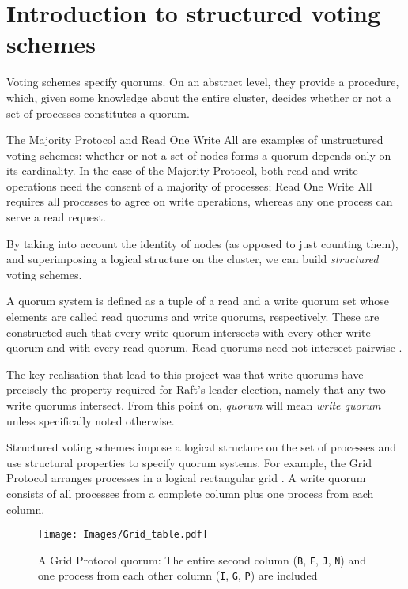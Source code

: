 \documentclass[12pt,chapterprefix=true,toc=bibliography,numbers=noendperiod,
               footnotes=multiple,twoside]{scrreprt}
\begin{document}
\section{Introduction to structured voting schemes}
\label{ssc:structured-voting-schemes}

Voting schemes specify quorums. On an abstract level, they provide a procedure, which, given some knowledge about the entire cluster, decides whether or not a set of processes constitutes a quorum.

The Majority Protocol and Read One Write All are examples of unstructured voting schemes: whether or not a set of nodes forms a quorum depends only on its cardinality. In the case of the Majority Protocol, both read and write operations need the consent of a majority of processes; Read One Write All requires all processes to agree on write operations, whereas any one process can serve a read request.

By taking into account the identity of nodes (as opposed to just counting them), and superimposing a logical structure on the cluster, we can build \emph{structured} voting schemes.


A quorum system is defined as a tuple of a read and a write quorum set whose elements are called read quorums and write quorums, respectively. These are constructed such that every write quorum intersects with every other write quorum and with every read quorum. Read quorums need not intersect pairwise \autocite[For a formal definition of \emph{quorum}, \emph{quorum set} and \emph{quorum system}, see][section 2.3]{voting}.

The key realisation that lead to this project was that write quorums have precisely the property required for Raft's leader election, namely that any two write quorums intersect. From this point on, \emph{quorum} will mean \emph{write quorum} unless specifically noted otherwise.

\label{voting-example}

Structured voting schemes impose a logical structure on the set of processes and use structural properties to specify quorum systems. For example, the Grid Protocol arranges processes in a logical rectangular grid \autocite{grid}. A write quorum consists of all processes from a complete column plus one process from each column.

\begin{figure}[h]
    \centering
    \texttt{[image: Images/Grid\_table.pdf]}
    \caption[Grid protocol quorum table]{A Grid Protocol quorum: The entire second column (\texttt{B}, \texttt{F}, \texttt{J}, \texttt{N}) and one process from each other column (\texttt{I}, \texttt{G}, \texttt{P}) are included}
    \label{fig:grid-quorum}
\end{figure}
\end{document}
